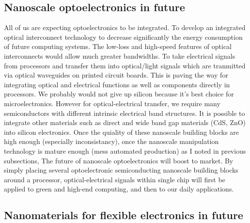 \subsection{Nanoscale optoelectronics in future}
All of us are expecting optoelectronics to be integrated. To develop an integrated optical interconnect technology to decrease significantly the energy consumption of future computing systems. The low-loss and high-speed features of optical interconnects would allow much greater bandwidths. To take electrical signals from processors and transfer them into optical/light signals which are tranmitted via optical waveguides on printed circuit boards. This is paving the way for integrating optical and electrical functions as well as components directly in processors. 
We probably would not give up silicon because it's best choice for microelectronics. However for optical-electrical transfer, we require many semiconductors with different intrinsic electrical band structures. It is possible to integrate other materials such as direct and wide band gap materials (CdS, ZnO) into silicon electronics. 
Once the quiality of these nanoscale building blocks are high enough (especially inconsistancy), once the nanoscale manipulation technology is mature enough (mess automated production) as I noted in previous subsections, The future of nanoscale optoelectronics will boost to market. By simply placing several optoelectronic semiconducting nanoscale building blocks around a processor, optical-electrical signals within single chip will first be applied to green and high-end computing, and then to our daily applications. 

\subsection{Nanomaterials for flexible electronics in future}
